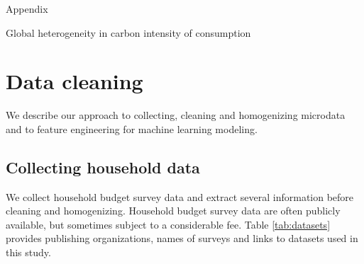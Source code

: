 \documentclass[12pt, a4paper]{article}
\begin{document}
\appendix 
{\Huge Appendix} \label{sec:appendix}

Global heterogeneity in carbon intensity of consumption

\clearpage
\section{Data cleaning} \label{sec:cleaning}

We describe our approach to collecting, cleaning and homogenizing microdata and to feature engineering for machine learning modeling.

\subsection{Collecting household data}

We collect household budget survey data and extract several information before cleaning and homogenizing. Household budget survey data are often publicly available, but sometimes subject to a considerable fee. Table \ref{tab:datasets} provides publishing organizations, names of surveys and links to datasets used in this study.
\end{document}

